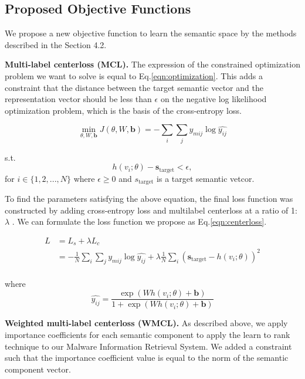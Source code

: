 \subsection{Proposed Objective Functions}
We propose a new objective function to learn the semantic space by the methods described in the Section 4.2.

\textbf{Multi-label centerloss (MCL). }
The expression of the constrained optimization problem we want to solve is equal to Eq.\ref{eqn:optimization}. This adds a constraint that the distance between the target semantic vector and the representation vector should be less than $\epsilon$ on the negative log likelihood optimization problem, which is the basis of the cross-entropy loss.



\begin{equation}
\label{eqn:optimization}
\min_{\theta, W, \mathbf{b}} J(\theta, W, \mathbf{b}) = -\sum_i{ \sum_j{ y_{mij} \log{\hat{y_{ij}}}}}
\end{equation}

s.t.
\[
h(v_i;\theta) - \mathbf{s}_\text{target} < \epsilon ,
\]
for $i \in \{1,2, ..., N\}$ where $\epsilon \geq 0$ and $s_\text{target}$ is a target semantic vetcor.

To find the parameters satisfying the above equation, the final loss function was constructed by adding cross-entropy loss and multilabel centerloss at a ratio of 1:$\lambda$ \cite{wen2016discriminative}. We can formulate the loss function we propose as Eq.\ref{eqn:centerloss}. 

\begin{equation}
\label{eqn:centerloss}
\begin{aligned}
L &= L_s + \lambda L_c \\
 &= -\frac{1}{N}\sum_i{\sum_j{ y_{mij} \log{\hat{y_{ij}}}}} 
+ \lambda \frac{1}{N} \sum_i{( \mathbf{s}_{\text{target}} - h(v_i;\theta))^2}\\
\end{aligned}
\end{equation}

where 
\[
\hat{y_{ij}} = \frac{\exp(Wh(v_i;\theta)+\mathbf{b})}{ 1 + \exp(Wh(v_i;\theta)+\mathbf{b})}
\]


  
\textbf{Weighted multi-label centerloss (WMCL). }
As described above, we apply importance coefficients for each semantic component to apply the learn to rank technique to our Malware Information Retrieval System. We added a constraint such that the importance coefficient value is equal to the norm of the semantic component vector. 

